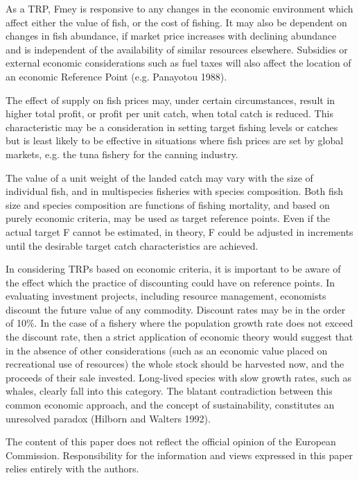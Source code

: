 \documentclass[12pt,oneline,a4paper,numbib]{ouparticle}
\numberwithin{equation}{subsection} %
\begin{document}
As a TRP, Fmey is responsive to any changes in the economic environment which affect either the value of fish, or the cost of fishing. It may also be dependent on changes in fish abundance, if market price increases with declining abundance and is independent of the availability of similar resources elsewhere. Subsidies or external economic considerations such as fuel taxes will also affect the location of an economic Reference Point (e.g. Panayotou 1988).

The effect of supply on fish prices may, under certain circumstances, result in higher total profit, or profit per unit catch, when total catch is reduced. This characteristic may be a consideration in setting target fishing levels or catches but is least likely to be effective in situations where fish prices are set by global markets, e.g. the tuna fishery for the canning industry.

The value of a unit weight of the landed catch may vary with the size of individual fish, and in multispecies fisheries with species composition. Both fish size and species composition are functions of fishing mortality, and based on purely economic criteria, may be used as target reference points. Even if the actual target F cannot be estimated, in theory, F could be adjusted in increments until the desirable target catch characteristics are achieved.

In considering TRPs based on economic criteria, it is important to be aware of the effect which the practice of discounting could have on reference points. In evaluating investment projects, including resource management, economists discount the future value of any commodity. Discount rates may be in the order of 10\%. In the case of a fishery where the population growth rate does not exceed the discount rate, then a strict application of economic theory would suggest that in the absence of other considerations (such as an economic value placed on recreational use of resources) the whole stock should be harvested now, and the proceeds of their sale invested. Long-lived species with slow growth rates, such as whales, clearly fall into this category. The blatant contradiction between this common economic approach, and the concept of sustainability, constitutes an unresolved paradox (Hilborn and Walters 1992).

\begin{notes}[Acknowledgements]
The content of this paper does not reflect the official opinion of the European Commission. Responsibility for the information and views expressed in this paper relies entirely with the authors.
\end{notes}




\end{document}

